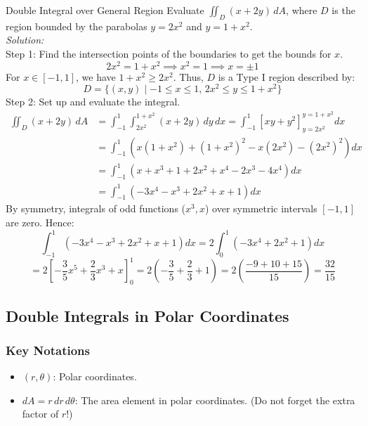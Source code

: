 \documentclass[11pt]{article}
\begin{document}
\begin{examplebox}{Double Integral over General Region}
    Evaluate $\iint_D (x + 2y)\,dA$, where $D$ is the region bounded by the parabolas $y = 2x^2$ and $y = 1 + x^2$.\\
    \textit{Solution:}\\
    Step 1: Find the intersection points of the boundaries to get the bounds for $x$.
    \[ 2x^2 = 1 + x^2 \implies x^2 = 1 \implies x = \pm 1 \]
    For $x \in [-1, 1]$, we have $1+x^2 \ge 2x^2$. Thus, $D$ is a Type I region described by:
    \[ D = \{(x,y) \mid -1 \le x \le 1, \, 2x^2 \le y \le 1+x^2\} \]
    Step 2: Set up and evaluate the integral.
    \begin{align*}
        \iint_D (x + 2y)\,dA &= \int_{-1}^1 \int_{2x^2}^{1+x^2} (x + 2y)\,dy\,dx = \int_{-1}^1 \left[ xy + y^2 \right]_{y=2x^2}^{y=1+x^2} dx \\
        &= \int_{-1}^1 \left( x(1+x^2) + (1+x^2)^2 - x(2x^2) - (2x^2)^2 \right) dx \\
        &= \int_{-1}^1 \left( x + x^3 + 1 + 2x^2 + x^4 - 2x^3 - 4x^4 \right) dx \\
        &= \int_{-1}^1 \left( -3x^4 - x^3 + 2x^2 + x + 1 \right) dx
    \end{align*}
    By symmetry, integrals of odd functions ($x^3, x$) over symmetric intervals $[-1, 1]$ are zero. Hence:
    \[ \int_{-1}^1 \left( -3x^4 - x^3 + 2x^2 + x + 1 \right) dx = 2\int_0^1 \left( -3x^4 + 2x^2 + 1 \right) dx \]
    \[ = 2\left[ -\frac{3}{5}x^5 + \frac{2}{3}x^3 + x \right]_0^1 = 2\left( -\frac{3}{5} + \frac{2}{3} + 1 \right) = 2\left( \frac{-9 + 10 + 15}{15} \right) = \frac{32}{15} \]
\end{examplebox}


\subsection{Double Integrals in Polar Coordinates}
\subsubsection*{Key Notations}
\begin{itemize}
    \item $(r, \theta)$: Polar coordinates.
    \item $dA = r\,dr\,d\theta$: The area element in polar coordinates. (Do not forget the extra factor of $r$!)
\end{itemize}
\end{document}
